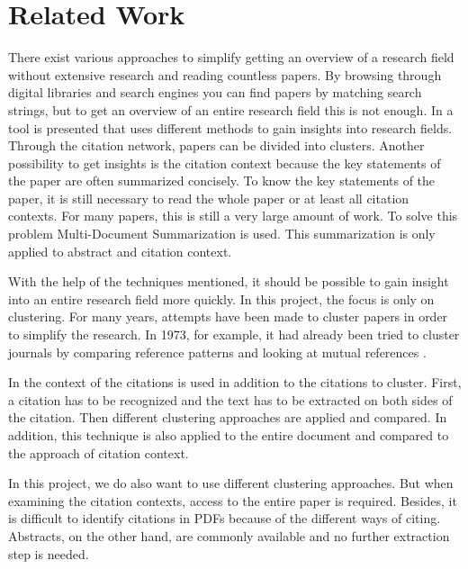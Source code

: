 \section{Related Work}

There exist various approaches to simplify getting an overview of a research field without extensive research and reading countless papers. By browsing through digital libraries and search engines you can find papers by matching search strings, but to get an overview of an entire research field this is not enough.
In \cite{Rapid_understanding_of_scientific_paper_collections} a tool is presented that uses different methods to gain insights into research fields.
Through the citation network, papers can be divided into clusters.
Another possibility to get insights is the citation context because the key statements of the paper are often summarized concisely.  To know the key statements of the paper, it is still necessary to read the whole paper or at least all citation contexts. For many papers, this is still a very large amount of work. To solve this problem Multi-Document Summarization is used. This summarization is only applied to abstract and citation context.

With the help of the techniques mentioned, it should be possible to gain insight into an entire research field more quickly.
In this project, the focus is only on clustering.
For many years, attempts have been made to cluster papers in order to simplify the research. In 1973, for example, it had already been tried to cluster journals by comparing reference patterns and looking at mutual references \cite{Clustering_of_scientific_journals}.

In \cite{Document_clustering_of_scientific_texts_using_citation_contexts} the context of the citations is used in addition to the citations to cluster.
First, a citation has to be recognized and the text has to be extracted on both sides of the citation. Then different clustering approaches are applied and compared. In addition, this technique is also applied to the entire document and compared to the approach of citation context.

In this project, we do also want to use different clustering approaches.
But when examining the citation contexts, access to the entire paper is required. Besides, it is difficult to identify citations in PDFs because of the different ways of citing. Abstracts, on the other hand, are commonly available and no further extraction step is needed.

